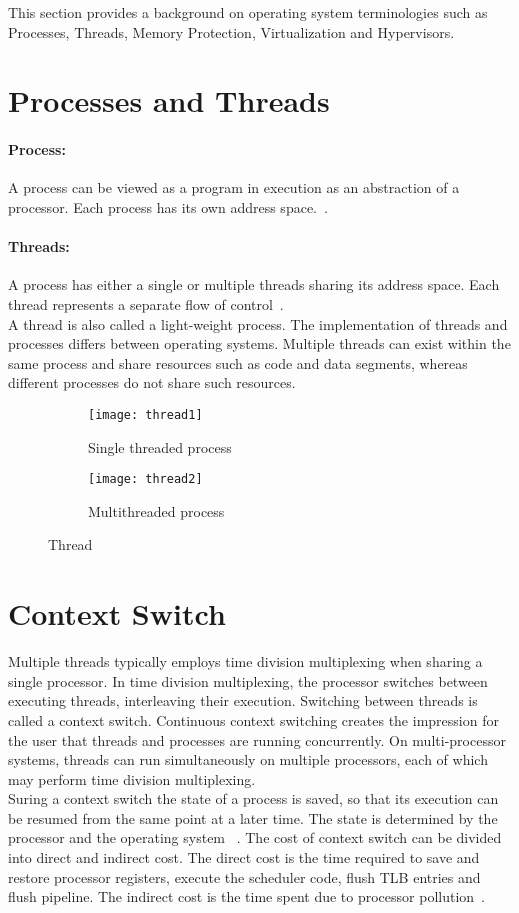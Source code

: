 This section provides a background on operating system terminologies such as Processes, Threads, Memory Protection, Virtualization and Hypervisors.
\section{Processes and Threads}
\paragraph{Process:} A process can be viewed as a program in execution as an abstraction of a processor. Each process has its own address space.~\cite{Galvin}.

\paragraph{Threads:} A process has either a single or multiple threads sharing its address space. Each thread represents a separate flow of control~\cite{Galvin}.
\\[3mm]
A thread is also called a light-weight process. The implementation of threads and processes differs between operating systems. Multiple threads can exist within the same process and share resources such as code and data segments, whereas different processes do not share such resources. 
\begin{figure}[!ht]
    \centering
    \begin{subfigure}[b]{0.45\textwidth}
	\texttt{[image: thread1]}
	\caption{Single threaded process}
	\label{fig:thread1}
    \end{subfigure}
	\hfill
    \begin{subfigure}[b]{0.45\textwidth}
	\texttt{[image: thread2]}
	\caption{Multithreaded process}
	\label{fig:thread2}
    \end{subfigure}
    \caption{Thread}\label{fig:threads}
\end{figure}

\section{Context Switch}
Multiple threads typically employs time division multiplexing when sharing a single processor. In time division multiplexing, the processor switches between executing threads, interleaving their execution. Switching between threads is called a context switch. Continuous context switching creates the impression for the user that threads and processes are running concurrently. On multi-processor systems, threads can run simultaneously on multiple processors, each of which may perform time division multiplexing. 
\\[3mm]
Suring a context switch the state of a process is saved, so that its execution can be resumed from the same point at a later time. The state is determined by the processor and the operating system ~\cite{Galvin}. The cost of context switch can be divided into direct and indirect cost. The direct cost is the time required to save and restore processor registers, execute the scheduler code, flush TLB entries and flush pipeline. The indirect cost is the time spent due to processor pollution~\cite{Soares+:osdi10, Li:2007:QCC:1281700.1281702}.

